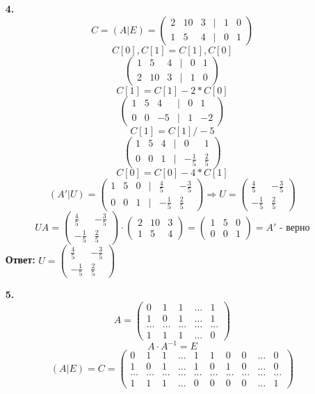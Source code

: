 \documentclass[a4paper]{article}
\newcommand{\mat}[1]{\begin{pmatrix} #1 \end{pmatrix}}
\renewcommand{\f}[2]{\frac{#1}{#2}}
\renewcommand{\r}{\Rightarrow}
\begin{document}
\begin{enumerate}
    \item[\textbf{4.}]
    $$C = (A|E) = \mat{2 & 10 & 3 & | & 1 & 0 \\ 1 & 5 & 4 & | & 0 & 1}$$
    $$C[0], C[1] = C[1], C[0]$$
    $$\mat{ 1 & 5 & 4 & | & 0 & 1 \\ 2 & 10 & 3 & | & 1 & 0}$$
    $$C[1] = C[1] - 2*C[0]$$
    $$\mat{1 & 5 & 4 & | & 0 & 1 \\ 0 & 0 & -5 & | & 1 & -2}$$
    $$C[1] = C[1]/-5$$
    $$\mat{1 & 5 & 4 & | & 0 & 1 \\ 0 & 0 & 1 & | & -\f{1}{5} & \f{2}{5}}$$
    $$C[0] = C[0] - 4*C[1]$$
    $$(A'|U) = \mat{1 & 5 & 0 & | & \f{4}{5} & -\f{3}{5} \\ 0 & 0 & 1 & | & -\f{1}{5} & \f{2}{5}} \r U = \mat{\f{4}{5} & -\f{3}{5} \\ -\f{1}{5} & \f{2}{5}}$$
    $$UA = \mat{\f{4}{5} & -\f{3}{5} \\ -\f{1}{5} & \f{2}{5}} \cdot \mat{2 & 10 & 3 \\ 1 & 5 & 4} = \mat{1 & 5 & 0 \\ 0 & 0 & 1} = A' \text{ - верно}$$
    \textbf{Ответ:} $U = \mat{\f{4}{5} & -\f{3}{5} \\ -\f{1}{5} & \f{2}{5}}$

    \item[\textbf{5.}]
    $$A = \mat{0 & 1 & 1 & \dots & 1 \\
           1 & 0 & 1 & \dots & 1 \\
           \dots & \dots & \dots & \dots & \dots \\
           1 & 1 & 1 & \dots & 0}$$
    $$A\cdot A^{-1} = E$$
    $$(A|E) = C = \mat{0 & 1 & 1 & \dots & 1 & 1 & 0 & 0 & \dots & 0\\
                       1 & 0 & 1 & \dots & 1 & 0 & 1 & 0 & \dots & 0\\
                       \dots & \dots & \dots & \dots & \dots & \dots & \dots & \dots & \dots & \dots\\
                       1 & 1 & 1 & \dots & 0 & 0 & 0 & 0 & \dots & 1}$$


\end{enumerate}
\end{document}
